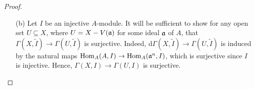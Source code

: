 \documentclass{article}
\begin{document}
\begin{enumerate} [label=\textbf{\arabic*.}, leftmargin=0em]
\begin{proof}
\begin{itemize} [leftmargin=0cm]
It remains to show $\phi$ is surjective.
Let $s \in \Gamma(U, \widetilde{M})$ be any section.
For each $i$, we can express $\restr{s}{U_i}$ as $m_i/f_i^{n_i}$ for some $n_i > 0$ and $m_i \in M$ such that $\restr{m_i/f_i^{n_i}}{U_i \cap U_j} = \restr{m_j/f_j^{n_j}}{U_i \cap U_j}$, where $U_i \cap U_j = \spec{A_{f_if_j}}$ for all $i, j$.
Choose $n = n_i$ that works for all $i$, so we have
\begin{equation*}
  \frac{f_j^n m_i}{(f_if_j)^n} = \frac{f_i^n m_j}{(f_if_j)^n}.
\end{equation*}
We want to show there exists an $A$-homomoprhism $\alpha : \goth{a}^N \to M$ for some $N \geq n$ such that $\alpha_i(1) = f_i^{N-n} m_i / f_i^N$.
Imitating the proof of (3.3), let $\goth{b}_1 \subseteq \goth{b}_2 \subseteq \cdots$ be the sequence of annihilators of $\cdots \subseteq \goth{a}^2 \subseteq \goth{a}$.
Since $A$ is Noetherian, there is an $r$ such that $\goth{b}_r = \goth{b}_{r + 1} = \cdots$.
Define $\sigma : \goth{a}^{n + r} \to M$ by sending $f_i^{n + r}$ to $f_i^r m_i$ for all $i$ and extending by zero.
This is a well-defined homomorphism because the annihilator of $f_i^{n + r}$ is $\goth{b}_{n + r} = \goth{b}_r$, and $\goth{b}_r$ annihilates $f_i^r m_i$.
Hence, $\phi_{n + r}(\sigma) = s$.

\item[(b)] Let $I$ be an injective $A$-module.
It will be sufficient to show for any open set $U \subseteq X$, where $U = X - V(\mathfrak{a})$ for some ideal $\mathfrak{a}$ of $A$, that $\Gamma(X, \tilde{I}) \to \Gamma(U, \tilde{I})$ is surjective.
Indeed, d$\Gamma(X, \tilde{I}) \to \Gamma(U, \tilde{I})$ is induced by the natural maps $\operatorname{Hom}_A(A, I) \to \operatorname{Hom}_A(\mathfrak{a}^n, I)$, which is surjective since $I$ is injective.
Hence, $\Gamma(X, I) \to \Gamma(U, I)$ is surjective.
\end{itemize}
\end{proof}

\end{enumerate}
\end{document}
